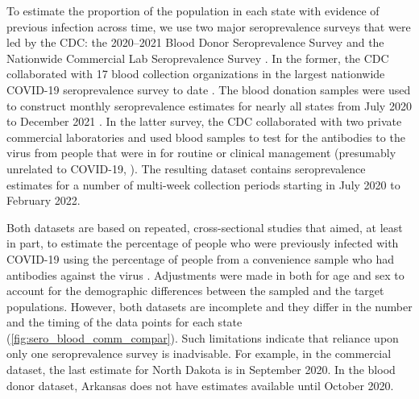 \documentclass{article}
\begin{document}
To estimate the proportion of the population in each state with evidence of
previous infection across time, we use two major seroprevalence surveys that
were led by the CDC: the 2020--2021 Blood Donor Seroprevalence Survey and the
Nationwide Commercial Lab Seroprevalence Survey \citep{cdc2021blood,
cdc2021comm}. In the former, the CDC collaborated with 17 blood collection
organizations in the largest nationwide COVID-19 seroprevalence survey to date
\citep{cdc2021blood}. The blood donation samples were used to construct monthly
seroprevalence estimates for nearly all states from July 2020 to December 2021
\citep{jones2021estimated}. In the latter survey, the CDC collaborated with two
private commercial laboratories and used blood samples to test for the
antibodies to the virus from people that were in for routine or clinical
management (presumably unrelated to COVID-19, \citealp{bajema2021estimated}). The
resulting dataset contains seroprevalence estimates for a number of multi-week
collection periods starting in July 2020 to February 2022. 

Both datasets are based on repeated, cross-sectional studies that aimed, at
least in part, to estimate the percentage of people who were previously infected
with COVID-19 using the percentage of people from a convenience sample who had
antibodies against the virus \citep{bajema2021estimated, cdc2020data,
jones2021estimated}. Adjustments were made in both for age and sex to account
for the demographic differences between the sampled and the target populations.
However, both datasets are incomplete and they differ in the number and the
timing of the data points for each state (\autoref{fig:sero_blood_comm_compar}).
Such limitations indicate that reliance upon only one seroprevalence
survey is inadvisable.
For example, in the commercial dataset, the last estimate for North Dakota is in
September 2020. In the blood donor dataset, Arkansas does not have estimates
available until October 2020. 
\end{document}
